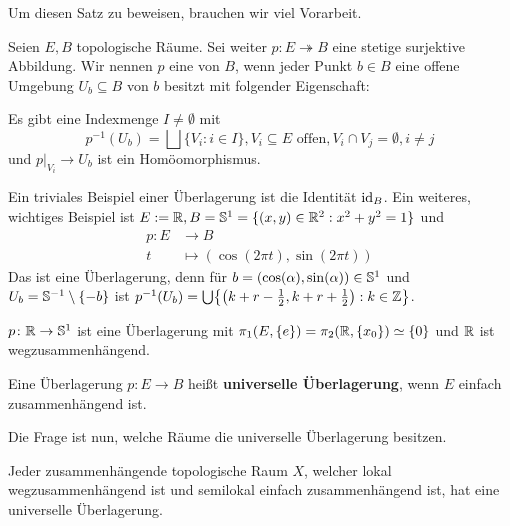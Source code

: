 Um diesen Satz zu beweisen, brauchen wir viel Vorarbeit.


\begin{no-erinnerung}
	Seien $E,B$ topologische Räume. 
	Sei weiter $p \colon E \twoheadrightarrow B$ eine stetige surjektive Abbildung.
	Wir nennen $p$ eine  von $B$, wenn jeder Punkt $b \in B$ eine offene Umgebung $U_b \subseteq B$ von $b$ besitzt mit folgender Eigenschaft:
	
	Es gibt eine Indexmenge $I \neq \emptyset$ mit
	\[
		p^{-1} (U_b) = \bigsqcup \{V_i : i \in I \}, V_i \subseteq E \text{ offen}, V_i \cap V_j = \emptyset, i \neq j
	\]
	und $p \big|_{V_i} \rightarrow U_b$ ist ein Homöomorphismus.
\end{no-erinnerung}

Ein triviales Beispiel einer Überlagerung ist die Identität $\operatorname{id}_B$. Ein weiteres, wichtiges Beispiel ist $E := \mathbb{R}, B = \mathbb{S}^1 = \{(x,y) \in \mathbb{R}^2 : x^2 + y^2 = 1 \}$ und
\begin{align*}
	p\colon E &\longrightarrow B \\
	t &\longmapsto (\cos(2\pi t),\sin(2\pi t))
\end{align*}
Das ist eine Überlagerung, denn für $b = (\cos(\alpha),\sin(\alpha)) \in \mathbb{S}^1$ und $U_b = \mathbb{S}^{-1} \setminus \{-b\}$ ist $p^{-1}(U_b) = \bigcup\penbrace*{ \enbrace*{k+r-\frac{1}{2},k+r+\frac{1}{2}} : k \in \ZZ}$.

$p \colon \mathbb{R} \rightarrow \mathbb{S}^1$ ist eine Überlagerung mit $\pi_1(E,\{e\}) = \pi_2(\mathbb{R},\{x_0\}) \simeq \{0\}$ und $\mathbb{R}$ ist wegzusammenhängend.

\begin{no-def}
	Eine Überlagerung $p \colon E \rightarrow B$ heißt \textbf{universelle Überlagerung}, wenn $E$ einfach zusammenhängend ist.  
\end{no-def}

Die Frage ist nun, welche Räume die universelle Überlagerung besitzen.

\begin{no-satz}
	Jeder zusammenhängende topologische Raum $X$, welcher lokal wegzusammenhängend ist und semilokal einfach zusammenhängend ist, hat eine universelle Überlagerung.  
\end{no-satz}

